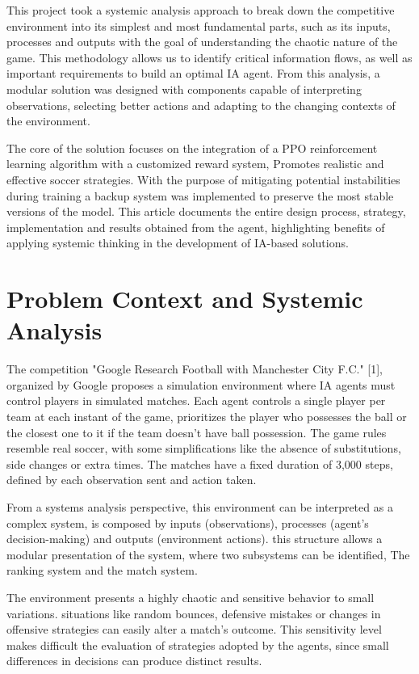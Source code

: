 \documentclass[conference]{IEEEtran}
\begin{document}
This project took a systemic analysis approach to break down the competitive environment into its simplest and most fundamental parts, such as its inputs, processes and outputs with the goal of understanding the chaotic nature of the game. This methodology allows us to identify critical information flows, as well as important requirements to build an optimal IA agent. From this analysis, a modular solution was designed with components capable of interpreting observations, selecting better actions and adapting to the changing contexts of the environment.

The core of the solution focuses on the integration of a PPO reinforcement learning algorithm with a customized reward system, Promotes realistic and effective soccer strategies. With the purpose of mitigating potential instabilities during training a backup system was implemented to preserve the most stable versions of the model. This article documents the entire design process, strategy, implementation and results obtained from the agent, highlighting benefits of applying systemic thinking in the development of IA-based solutions.

\section{Problem Context and Systemic Analysis}
The competition "Google Research Football with Manchester City F.C." [1], organized by Google proposes a simulation environment where IA agents must control players in simulated matches. Each agent controls a single player per team at each instant of the game, prioritizes the player who possesses the ball or the closest one to it if the team doesn't have ball possession. The game rules resemble real soccer, with some simplifications like the absence of substitutions, side changes or extra times. The matches have a fixed duration of 3,000 steps, defined by each observation sent and action taken.

From a systems analysis perspective, this environment can be interpreted as a complex system, is composed by inputs (observations), processes (agent's decision-making) and outputs (environment actions). this structure allows a modular presentation of the system, where two subsystems can be identified, The ranking system and the match system.

The environment presents a highly chaotic and sensitive behavior to small variations. situations like random bounces, defensive mistakes or changes in offensive strategies can easily alter a match's outcome. This sensitivity level makes difficult the evaluation of strategies adopted by the agents, since small differences in decisions can produce distinct results.
\end{document}
